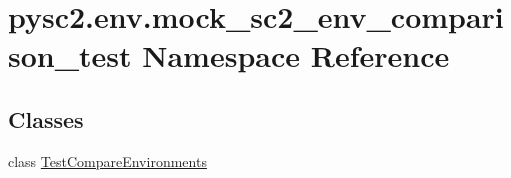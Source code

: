\hypertarget{namespacepysc2_1_1env_1_1mock__sc2__env__comparison__test}{}\section{pysc2.\+env.\+mock\+\_\+sc2\+\_\+env\+\_\+comparison\+\_\+test Namespace Reference}
\label{namespacepysc2_1_1env_1_1mock__sc2__env__comparison__test}
\subsection*{Classes}
\begin{DoxyCompactItemize}
\item 
class \mbox{\hyperlink{classpysc2_1_1env_1_1mock__sc2__env__comparison__test_1_1_test_compare_environments}{Test\+Compare\+Environments}}
\end{DoxyCompactItemize}

